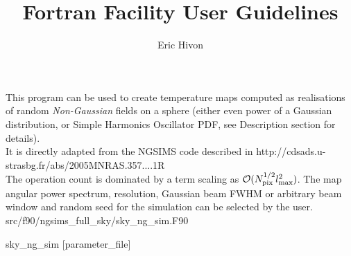
\sloppy


\title{\healpix Fortran Facility User Guidelines}
 \section[sky\_ng\_sim]{\nosectionname}
\label{fac:sky_ng_sim}
\author{Eric Hivon}

\begin{facility}
{This program can be used to create temperature \healpix maps computed as realisations 
of random {\em Non-Gaussian} fields on a sphere (either even power of a Gaussian
distribution, or Simple Harmonics Oscillator PDF, see Description section for
details). \\
It is directly adapted from the NGSIMS code described in 
%
{http://cdsads.u-strasbg.fr/abs/2005MNRAS.357....1R}%
\\
The operation count is dominated by a term scaling as
 ${\cal {O}}(N_\textrm{pix}^{1/2} l_{\textrm{max}}^2)$. 
The map angular power spectrum, resolution, Gaussian beam FWHM or arbitrary beam window  
and random seed for the simulation can be selected by the user.
}
{src/f90/ngsims\_full\_sky/sky\_ng\_sim.F90}
\end{facility}

\begin{f90facility}
{sky\_ng\_sim [parameter\_file]}
\end{f90facility}


